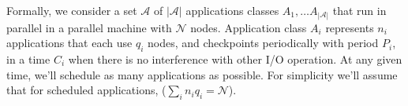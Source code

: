 \documentclass[conference]{IEEEtran}
\newcommand{\appset}{{\mathcal A}}
\newcommand{\nbnodesplat}{{\mathcal N}}
\newcommand{\nbapps}{|{\mathcal A}|}
\newcommand{\app}[1]{A_{#1}}
\newcommand{\nbapp}[1]{n_{#1}}
\newcommand{\nbnodes}[1]{q_{#1}}
\newcommand{\period}[1]{P_{#1}}
\newcommand{\ckpt}[1]{C_{#1}}
\begin{document}
Formally, we consider a set $\appset$ of $\nbapps$ applications
classes $\app{1}, \ldots \app{\nbapps}$ that run in parallel in a
parallel machine with $\nbnodesplat$ nodes. Application class
$\app{i}$ represents $\nbapp{i}$ applications that each use
$\nbnodes{i}$ nodes, and checkpoints
periodically with period $\period{i}$, in a time $\ckpt{i}$ when there
is no interference with other I/O operation. At any given time, we'll schedule as many applications as possible. For simplicity we'll assume that for scheduled applications, ($\sum_{i}\nbapp{i} \nbnodes{i} = \nbnodesplat$). 

%
%
\end{document}
